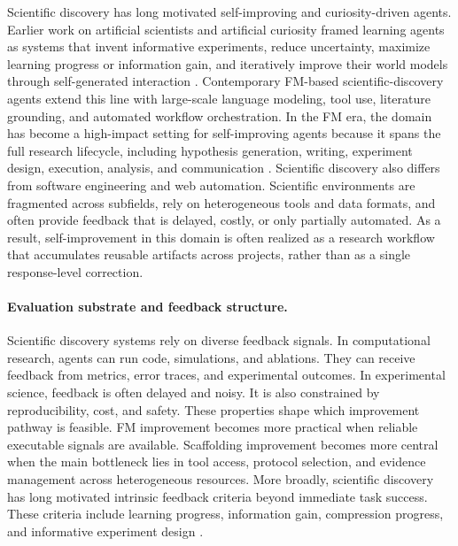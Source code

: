 \documentclass{article}
\begin{document}
Scientific discovery has long motivated self-improving and curiosity-driven agents. Earlier work on artificial scientists and artificial curiosity framed learning agents as systems that invent informative experiments, reduce uncertainty, maximize learning progress or information gain, and iteratively improve their world models through self-generated interaction \citep{schmidhuber1990making, schmidhuber1991curious, storck1995reinforcement, schmidhuber1997s, schmidhuber2003exploring, schmidhuber2013powerplay, schmidhuber2015learning}. Contemporary FM-based scientific-discovery agents extend this line with large-scale language modeling, tool use, literature grounding, and automated workflow orchestration. In the FM era, the domain has become a high-impact setting for self-improving agents because it spans the full research lifecycle, including hypothesis generation, writing, experiment design, execution, analysis, and communication \citep{lu2024aiscientistfullyautomated, yamada2025aiscientistv2workshoplevelautomated, xiong2025beyond}.
Scientific discovery also differs from software engineering and web automation. Scientific environments are fragmented across subfields, rely on heterogeneous tools and data formats, and often provide feedback that is delayed, costly, or only partially automated. As a result, self-improvement in this domain is often realized as a research workflow that accumulates reusable artifacts across projects, rather than as a single response-level correction.

\paragraph{Evaluation substrate and feedback structure.}
Scientific discovery systems rely on diverse feedback signals. In computational research, agents can run code, simulations, and ablations. They can receive feedback from metrics, error traces, and experimental outcomes. In experimental science, feedback is often delayed and noisy. It is also constrained by reproducibility, cost, and safety. These properties shape which improvement pathway is feasible. FM improvement becomes more practical when reliable executable signals are available. Scaffolding improvement becomes more central when the main bottleneck lies in tool access, protocol selection, and evidence management across heterogeneous resources. More broadly, scientific discovery has long motivated intrinsic feedback criteria beyond immediate task success. These criteria include learning progress, information gain, compression progress, and informative experiment design \citep{storck1995reinforcement, schmidhuber2007simple, schmidhuber2010formal, schmidhuber2013powerplay}.
\end{document}

